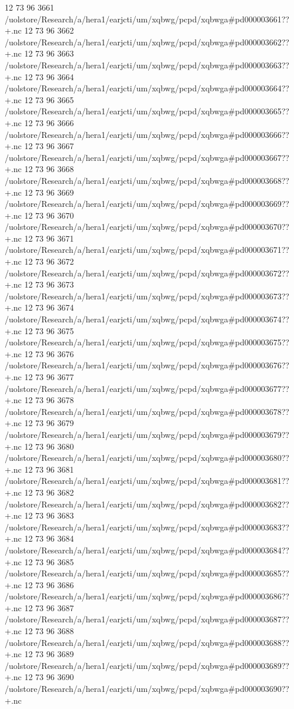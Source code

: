 12 73 96
3661
/uolstore/Research/a/hera1/earjcti/um/xqbwg/pcpd/xqbwga#pd000003661??+.nc
12 73 96
3662
/uolstore/Research/a/hera1/earjcti/um/xqbwg/pcpd/xqbwga#pd000003662??+.nc
12 73 96
3663
/uolstore/Research/a/hera1/earjcti/um/xqbwg/pcpd/xqbwga#pd000003663??+.nc
12 73 96
3664
/uolstore/Research/a/hera1/earjcti/um/xqbwg/pcpd/xqbwga#pd000003664??+.nc
12 73 96
3665
/uolstore/Research/a/hera1/earjcti/um/xqbwg/pcpd/xqbwga#pd000003665??+.nc
12 73 96
3666
/uolstore/Research/a/hera1/earjcti/um/xqbwg/pcpd/xqbwga#pd000003666??+.nc
12 73 96
3667
/uolstore/Research/a/hera1/earjcti/um/xqbwg/pcpd/xqbwga#pd000003667??+.nc
12 73 96
3668
/uolstore/Research/a/hera1/earjcti/um/xqbwg/pcpd/xqbwga#pd000003668??+.nc
12 73 96
3669
/uolstore/Research/a/hera1/earjcti/um/xqbwg/pcpd/xqbwga#pd000003669??+.nc
12 73 96
3670
/uolstore/Research/a/hera1/earjcti/um/xqbwg/pcpd/xqbwga#pd000003670??+.nc
12 73 96
3671
/uolstore/Research/a/hera1/earjcti/um/xqbwg/pcpd/xqbwga#pd000003671??+.nc
12 73 96
3672
/uolstore/Research/a/hera1/earjcti/um/xqbwg/pcpd/xqbwga#pd000003672??+.nc
12 73 96
3673
/uolstore/Research/a/hera1/earjcti/um/xqbwg/pcpd/xqbwga#pd000003673??+.nc
12 73 96
3674
/uolstore/Research/a/hera1/earjcti/um/xqbwg/pcpd/xqbwga#pd000003674??+.nc
12 73 96
3675
/uolstore/Research/a/hera1/earjcti/um/xqbwg/pcpd/xqbwga#pd000003675??+.nc
12 73 96
3676
/uolstore/Research/a/hera1/earjcti/um/xqbwg/pcpd/xqbwga#pd000003676??+.nc
12 73 96
3677
/uolstore/Research/a/hera1/earjcti/um/xqbwg/pcpd/xqbwga#pd000003677??+.nc
12 73 96
3678
/uolstore/Research/a/hera1/earjcti/um/xqbwg/pcpd/xqbwga#pd000003678??+.nc
12 73 96
3679
/uolstore/Research/a/hera1/earjcti/um/xqbwg/pcpd/xqbwga#pd000003679??+.nc
12 73 96
3680
/uolstore/Research/a/hera1/earjcti/um/xqbwg/pcpd/xqbwga#pd000003680??+.nc
12 73 96
3681
/uolstore/Research/a/hera1/earjcti/um/xqbwg/pcpd/xqbwga#pd000003681??+.nc
12 73 96
3682
/uolstore/Research/a/hera1/earjcti/um/xqbwg/pcpd/xqbwga#pd000003682??+.nc
12 73 96
3683
/uolstore/Research/a/hera1/earjcti/um/xqbwg/pcpd/xqbwga#pd000003683??+.nc
12 73 96
3684
/uolstore/Research/a/hera1/earjcti/um/xqbwg/pcpd/xqbwga#pd000003684??+.nc
12 73 96
3685
/uolstore/Research/a/hera1/earjcti/um/xqbwg/pcpd/xqbwga#pd000003685??+.nc
12 73 96
3686
/uolstore/Research/a/hera1/earjcti/um/xqbwg/pcpd/xqbwga#pd000003686??+.nc
12 73 96
3687
/uolstore/Research/a/hera1/earjcti/um/xqbwg/pcpd/xqbwga#pd000003687??+.nc
12 73 96
3688
/uolstore/Research/a/hera1/earjcti/um/xqbwg/pcpd/xqbwga#pd000003688??+.nc
12 73 96
3689
/uolstore/Research/a/hera1/earjcti/um/xqbwg/pcpd/xqbwga#pd000003689??+.nc
12 73 96
3690
/uolstore/Research/a/hera1/earjcti/um/xqbwg/pcpd/xqbwga#pd000003690??+.nc
